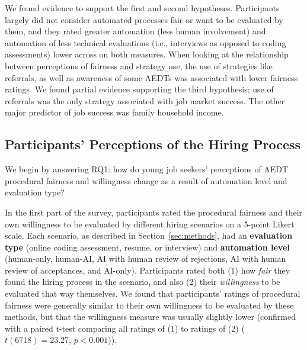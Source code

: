 We found evidence to support the first and second hypotheses. Participants largely did not consider automated processes fair or want to be evaluated by them, and they rated greater automation (less human involvement) and automation of less technical evaluations (i.e., interviews as opposed to coding assessments) lower across on both measures.
When looking at the relationship between perceptions of fairness and strategy use, the use of strategies like referrals, as well as awareness of some AEDTs was associated with lower fairness ratings. 
We found partial evidence supporting the third hypothesis; use of referrals was the only strategy associated with job market success. The other major predictor of job success was family household income. 


\subsection{Participants' Perceptions of the Hiring Process}

We begin by answering RQ1: how do young job seekers' perceptions of AEDT procedural fairness and willingness change as a result of automation level and evaluation type?

In the first part of the survey, participants rated the procedural fairness and their own willingness to be evaluated by different hiring scenarios on a 5-point Likert scale. Each scenario, as described in Section~\ref{sec:methods}, had an \textbf{evaluation type} (online coding assessment, resume, or interview) and \textbf{automation level} (human-only, human-AI, AI with human review of rejections, AI with human review of acceptances, and AI-only). Participants rated both (1) how \textit{fair} they found the hiring process in the scenario, and also (2) their \textit{willingness} to be evaluated that way themselves. We found that participants' ratings of procedural fairness were generally similar to their own willingness to be evaluated by these methods, but that the  willingness measure was usually slightly lower (confirmed with a paired t-test comparing all ratings of (1) to ratings of (2) ($t(6718) = 23.27$, $p < 0.001$)).

